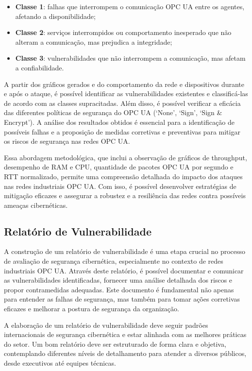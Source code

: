     \begin{itemize}
        \item \textbf{Classe 1}: falhas que interrompem o comunicação OPC UA entre os agentes, afetando a disponibilidade;
        \item \textbf{Classe 2}: serviços interrompidos ou comportamento inesperado que não alteram a comunicação, mas prejudica a integridade;
        \item \textbf{Classe 3}: vulnerabilidades que não interrompem a comunicação, mas afetam a confiabilidade.
    \end{itemize}

    A partir dos gráficos gerados e do comportamento da rede e dispositivos durante e após o ataque, é possível identificar as vulnerabilidades existentes e classificá-las de acordo com as classes supracitadas. Além disso, é possível verificar a eficácia das diferentes políticas de segurança do OPC UA (`None', `Sign', `Sign \& Encrypt'). A análise dos resultados obtidos é essencial para a identificação de possíveis falhas e a proposição de medidas corretivas e preventivas para mitigar os riscos de segurança nas redes OPC UA.

    Essa abordagem metodológica, que inclui a observação de gráficos de throughput, desempenho de RAM e CPU, quantidade de pacotes OPC UA por segundo e RTT normalizado, permite uma compreensão detalhada do impacto dos ataques nas redes industriais OPC UA. Com isso, é possível desenvolver estratégias de mitigação eficazes e assegurar a robustez e a resiliência das redes contra possíveis ameaças cibernéticas.
    
    \subsection{Relatório de Vulnerabilidade}

    A construção de um relatório de vulnerabilidade é uma etapa crucial no processo de avaliação de segurança cibernética, especialmente no contexto de redes industriais OPC UA. Através deste relatório, é possível documentar e comunicar as vulnerabilidades identificadas, fornecer uma análise detalhada dos riscos e propor contramedidas adequadas. Este documento é fundamental não apenas para entender as falhas de segurança, mas também para tomar ações corretivas eficazes e melhorar a postura de segurança da organização.

    A elaboração de um relatório de vulnerabilidade deve seguir padrões internacionais de segurança cibernética e estar alinhada com as melhores práticas do setor. Um bom relatório deve ser estruturado de forma clara e objetiva, contemplando diferentes níveis de detalhamento para atender a diversos públicos, desde executivos até equipes técnicas.

